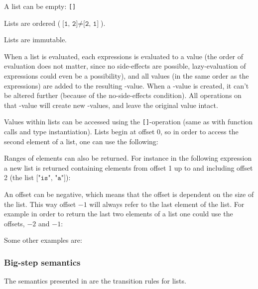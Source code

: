 \begin{nlist}
\item A list can be empty: \texttt{[]}
\item Lists are ordered ($\texttt{[1, 2]} \ne \texttt{[2, 1]}$).
\item Lists are immutable.
\end{nlist}

When a list is evaluated, each expressions is evaluated to a value (the order of
evaluation does not matter, since no side-effects are possible, lazy-evaluation
of expressions could even be a possibility), and all values (in the same order
as the expressions) are added to the resulting -value. When a
-value is created, it can't be altered further (because of the
no-side-effects condition). All operations on that -value will create
new -values, and leave the original value intact.

Values within lists can be accessed using the \texttt{[]}-operation (same as
with function calls and type instantiation). Lists begin at offset $0$, so in
order to access the second element of a list, one can use the following:


Ranges of elements can also be returned. For instance in the following
expression a new list is returned containing elements from offset 1 up
to and including offset 2 (the list $\texttt{["is", "a"]}$):


An offset can be negative, which means that the offset is dependent on
the size of the list. This way offset $-1$ will always refer to the last element
of the list. For example in order to return the last two elements of a list one
could use the offsets, $-2$ and $-1$:


Some other examples are:


\subsubsection{Big-step semantics}

The semantics presented in  are the transition rules
for lists.



